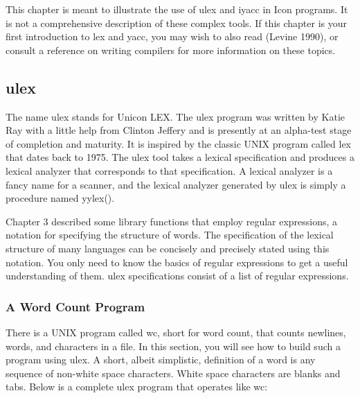 This chapter is meant to illustrate the use of \textsf{ulex} and
\textsf{iyacc} in Icon programs. It is not a comprehensive description
of these complex tools. If this chapter is your first introduction to
\textsf{lex} and \textsf{yacc}, you may wish to also read (Levine
1990), or consult a reference on writing compilers for more information
on these topics.

\subsection{ulex}

The name \textsf{ulex} stands for Unicon LEX. The \textsf{ulex}
program was written by Katie Ray with a little help from Clinton Jeffery
and is presently at an alpha-test stage of completion and maturity.
It is inspired by
the classic UNIX program called \textsf{lex} that dates back to 1975. The
\textsf{ulex} tool takes a lexical specification and produces a lexical
analyzer that corresponds to that specification. A lexical analyzer is a fancy name for a scanner, and the
lexical analyzer generated by \textsf{ulex} is simply a procedure named
\textsf{yylex()}.


Chapter 3 described some library functions that employ regular expressions, a notation for specifying the structure
of words. The specification of the lexical structure of many languages
can be concisely and precisely stated using this notation. You only
need to know the basics of regular expressions to get a useful
understanding of them. \textsf{ulex} specifications consist of a list
of regular expressions.

\subsubsection{A Word Count Program}

There is a UNIX program called \textsf{wc}, short for word count, that counts newlines, words, and characters in a
file. In this section, you will see how to build such a program using
\textsf{ulex}. A short, albeit simplistic, definition of a word is any
sequence of non-white space characters. White space characters are
blanks and tabs. Below is a complete \textsf{ulex} program that
operates like \textsf{wc}:

\pagebreak

